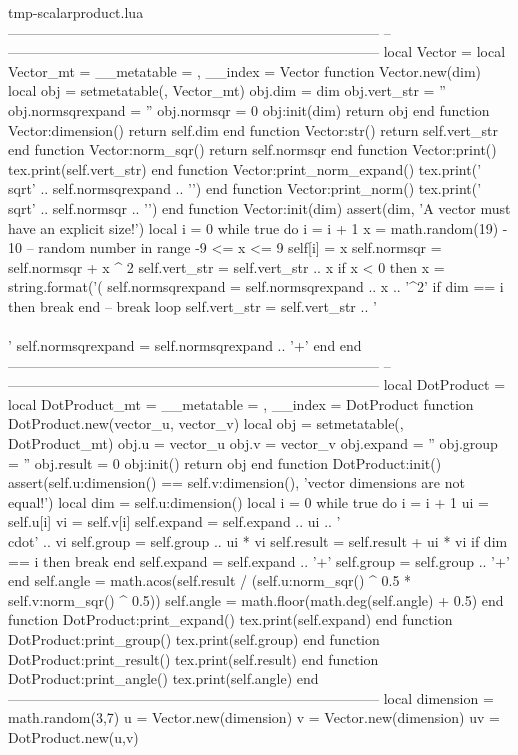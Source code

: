 \RequirePackage{filecontents}
\begin{filecontents*}{tmp-scalarproduct.lua}
--------------------------------------------------------------------------------
--
--------------------------------------------------------------------------------
local Vector = {}
local Vector_mt = { __metatable = {}, __index = Vector }
function Vector.new(dim)
   local obj = setmetatable({}, Vector_mt)
   obj.dim = dim
   obj.vert_str = ''
   obj.normsqrexpand = ''
   obj.normsqr = 0
   obj:init(dim)
   return obj
end
function Vector:dimension() return self.dim end
function Vector:str() return self.vert_str end
function Vector:norm_sqr() return self.normsqr end
function Vector:print() tex.print(self.vert_str) end
function Vector:print_norm_expand() tex.print('\\sqrt{' .. self.normsqrexpand .. '}') end
function Vector:print_norm() tex.print('\\sqrt{' .. self.normsqr .. '}') end
function Vector:init(dim) 
   assert(dim, 'A vector must have an explicit size!')
   local i = 0
   while true do
      i = i + 1
      x = math.random(19) - 10                                 -- random number in range -9 <= x <= 9
      self[i] = x
      self.normsqr = self.normsqr + x ^ 2
      self.vert_str = self.vert_str .. x
      if x < 0 then x = string.format('(%
      self.normsqrexpand = self.normsqrexpand .. x .. '^2'
      if dim == i then break end                               -- break loop
      self.vert_str = self.vert_str .. '\\\\'
      self.normsqrexpand = self.normsqrexpand .. '+'
   end
end
--------------------------------------------------------------------------------
--
--------------------------------------------------------------------------------
local DotProduct = {}
local DotProduct_mt = { __metatable = {}, __index = DotProduct }
function DotProduct.new(vector_u, vector_v)
   local obj = setmetatable({}, DotProduct_mt)
   obj.u = vector_u
   obj.v = vector_v
   obj.expand = ''
   obj.group = ''
   obj.result = 0
   obj:init()
   return obj
end
function DotProduct:init()
   assert(self.u:dimension() == self.v:dimension(), 'vector dimensions are not equal!')
   local dim = self.u:dimension()
   local i = 0
   while true do
      i = i + 1
      ui = self.u[i]
      vi = self.v[i]
      self.expand = self.expand .. ui .. '\\cdot' .. vi
      self.group = self.group .. ui * vi
      self.result = self.result + ui * vi
      if dim == i then break end
      self.expand = self.expand .. '+'
      self.group = self.group .. '+'
   end
   self.angle = math.acos(self.result / (self.u:norm_sqr() ^ 0.5 * self.v:norm_sqr() ^ 0.5))
   self.angle = math.floor(math.deg(self.angle) + 0.5)
end
function DotProduct:print_expand() tex.print(self.expand) end
function DotProduct:print_group() tex.print(self.group) end
function DotProduct:print_result() tex.print(self.result) end
function DotProduct:print_angle() tex.print(self.angle) end
--------------------------------------------------------------------------------
local dimension = math.random(3,7)
u = Vector.new(dimension)
v = Vector.new(dimension)
uv = DotProduct.new(u,v)
\end{filecontents*}
